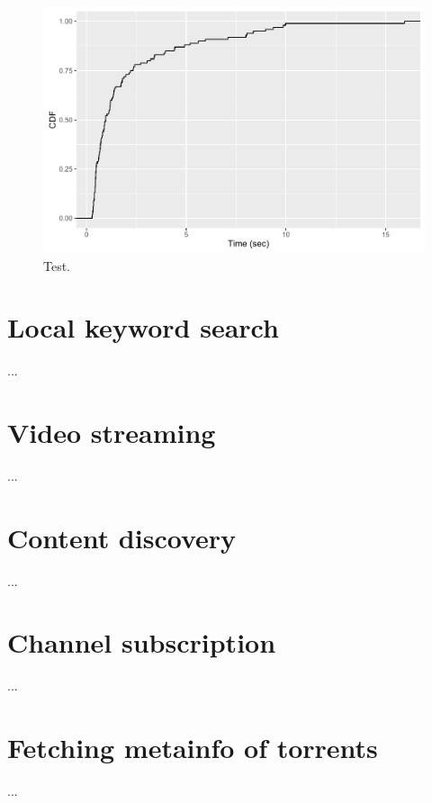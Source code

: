 \begin{figure}[!h]
	\centering
	\includegraphics[width=0.6\columnwidth]{images/experiments/cdf_remote_search_all_results}
	\caption{Test.}
	\label{fig:remote_search_all_result}
\end{figure}

\section{Local keyword search}
...

\section{Video streaming}
...

\section{Content discovery}
...

\section{Channel subscription}
...

\section{Fetching metainfo of torrents}
...

